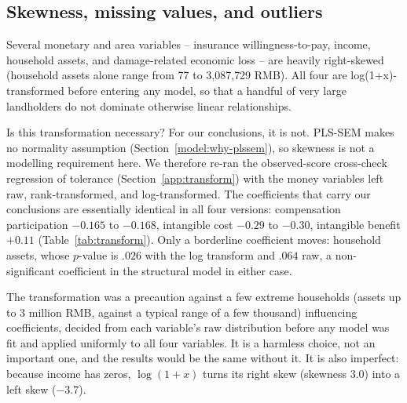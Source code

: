 \subsection{Skewness, missing values, and outliers}
\label{data:quality}

Several monetary and area variables -- insurance willingness-to-pay, income,
household assets, and damage-related economic loss -- are heavily right-skewed
(household assets alone range from 77 to 3{,}087{,}729 RMB). All four are
log(1+x)-transformed before entering any model, so that a handful of very
large landholders do not dominate otherwise linear relationships.

Is this transformation necessary? For our conclusions, it is not. PLS-SEM
makes no normality assumption (Section~\ref{model:why-plssem}), so skewness
is not a modelling requirement here. We therefore re-ran the observed-score
cross-check regression of tolerance (Section~\ref{app:transform}) with the
money variables left raw, rank-transformed, and log-transformed.
The coefficients that carry our conclusions are essentially identical in all
four versions: compensation participation $-0.165$ to $-0.168$, intangible
cost $-0.29$ to $-0.30$, intangible benefit $+0.11$ (Table~\ref{tab:transform}).
Only a borderline coefficient moves: household assets, whose $p$-value is
$.026$ with the log transform and $.064$ raw, a non-significant coefficient
in the structural model in either case.

The transformation was a precaution against a few extreme households
(assets up to 3 million RMB, against a typical range of a few thousand)
influencing coefficients, decided from each variable's raw distribution
before any model was fit and applied uniformly to all four variables. It is
a harmless choice, not an important one, and the results would be the same
without it. It is also imperfect: because income has zeros, $\log(1+x)$
turns its right skew (skewness $3.0$) into a left skew ($-3.7$).

